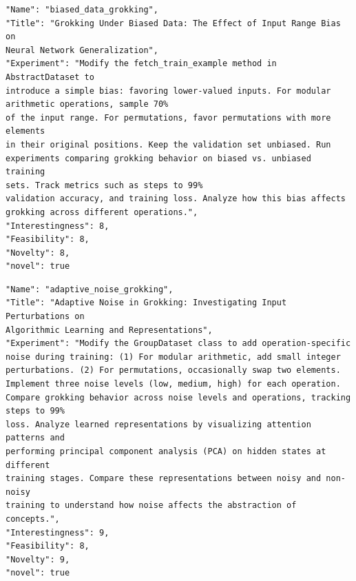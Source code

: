 \begin{tcolorbox}[breakable,colback=blue!5!white, colframe=blue!75!black, title=Idea 3/50 - \texttt{biased\_data\_grokking}]
\small
\begin{verbatim}
"Name": "biased_data_grokking",
"Title": "Grokking Under Biased Data: The Effect of Input Range Bias on
Neural Network Generalization",
"Experiment": "Modify the fetch_train_example method in AbstractDataset to
introduce a simple bias: favoring lower-valued inputs. For modular
arithmetic operations, sample 70%
of the input range. For permutations, favor permutations with more elements
in their original positions. Keep the validation set unbiased. Run
experiments comparing grokking behavior on biased vs. unbiased training
sets. Track metrics such as steps to 99%
validation accuracy, and training loss. Analyze how this bias affects
grokking across different operations.",
"Interestingness": 8,
"Feasibility": 8,
"Novelty": 8,
"novel": true
\end{verbatim}
\end{tcolorbox}

\begin{tcolorbox}[breakable,colback=blue!5!white, colframe=blue!75!black, title=Idea 4/50 - \texttt{adaptive\_noise\_grokking}]
\small
\begin{verbatim}
"Name": "adaptive_noise_grokking",
"Title": "Adaptive Noise in Grokking: Investigating Input Perturbations on
Algorithmic Learning and Representations",
"Experiment": "Modify the GroupDataset class to add operation-specific
noise during training: (1) For modular arithmetic, add small integer
perturbations. (2) For permutations, occasionally swap two elements.
Implement three noise levels (low, medium, high) for each operation.
Compare grokking behavior across noise levels and operations, tracking
steps to 99%
loss. Analyze learned representations by visualizing attention patterns and
performing principal component analysis (PCA) on hidden states at different
training stages. Compare these representations between noisy and non-noisy
training to understand how noise affects the abstraction of concepts.",
"Interestingness": 9,
"Feasibility": 8,
"Novelty": 9,
"novel": true
\end{verbatim}
\end{tcolorbox}


